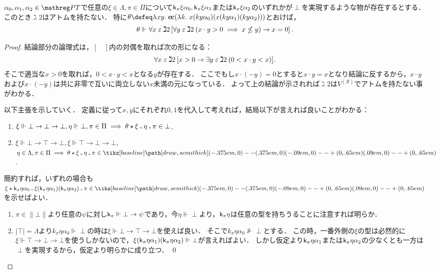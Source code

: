 \documentclass[realisability.tex]{subfiles}
\begin{document}
\begin{lemma}
 $\alpha_0, \alpha_1, \alpha_2 \in \PT$で任意の$\xi \in \Lambda, \pi \in \Pi$について$\mathsf{k}_\pi \xi \alpha_0, \mathsf{k}_\pi \xi \alpha_1$または$\mathsf{k}_\pi \xi \alpha_2$のいずれかが$\perp$を実現するような物が存在するとする．
 このとき$\gimel2$はアトムを持たない．
 特に$\theta \defeq \abs{xy}{\cc (\abs{k}{x (k y \alpha_0)(x (k y \alpha_1)(k y \alpha_2))})}$とおけば，
 \[
  \theta \Vdash \forall x \mathrel{\varepsilon} \gimel 2 \left[ \forall y \mathrel{\varepsilon} \gimel 2 \: (x \cdot y > 0 \implies x \nleq y) \to x = 0 \right].
 \]
\end{lemma}
\begin{proof}
 結論部分の論理式は，$[\quad]$内の対偶を取れば次の形になる：
 \[
  \forall x \mathrel{\varepsilon} \gimel 2 \: [ x > 0 \to \exists y \mathrel{\varepsilon} \gimel 2 \: (0 < x \cdot y < x)].
 \]
 そこで適当な$x > 0$を取れば，$0 < x \cdot y < x$となる$y$が存在する．
 ここでもし$x \cdot (- y) = 0$とすると$x \cdot y = x$となり結論に反するから，$x \cdot y$および$x \cdot (- y)$は共に非零で互いに両立しない$x$未満の元になっている．
 よって上の結論が示されれば$\gimel 2$は$V^{(\mathcal{R})}$でアトムを持たない事がわかる．

 以下主張を示していく．
 定義に従って$x, y$にそれぞれ$0, 1$を代入して考えれば，結局以下が言えれば良いことがわかる：
 \begin{enumerate}
  \item $\xi \Vdash \bot \to \bot \to \bot, \eta \Vdash \bot, \pi \in \Pi \implies \KVM{\theta \xi \eta \pi} \in \bot$,
  \item $\xi \Vdash \bot \to \top \to \bot, \xi \Vdash \top \to \bot \to \bot$, $\eta \in \Lambda, \pi \in \Pi \implies \KVM{\theta \xi \eta \pi} \in \pole$.
 \end{enumerate}
 簡約すれば，いずれの場合も$\KVM{\xi {{\conti_\pi \eta \alpha_0}}{\xi (\conti_\pi \eta \alpha_1)(\conti_\pi \eta \alpha_2)} \pi} \in \pole$を示せばよい．
 \begin{enumerate}
  \item $\pi \in \|\bot\|$より任意の$\psi$に対し$\mathsf{k}_\pi \Vdash \bot \to \psi$であり，今$\eta \Vdash \perp$より，$\mathsf{k}_\pi \eta$は任意の型を持ちうることに注意すれば明らか．
  \item $|\top| = \Lambda$より$k_\pi \eta \alpha_0 \Vdash \perp$の時は$\xi \Vdash \bot \to \top \to \bot$を使えば良い．
        そこで$k_\pi \eta \alpha_0 \nVdash \perp$とする．
        この時，一番外側の$\xi$の型は必然的に$\xi \Vdash \top \to \bot \to \bot$を使うしかないので，$\xi (\mathsf{k}_\pi \eta \alpha_1) (\mathsf{k}_\pi \eta \alpha_2) \Vdash \bot$が言えればよい．
        しかし仮定より$\mathsf{k}_\pi \eta \alpha_1$または$\mathsf{k}_\pi \eta \alpha_2$の少なくとも一方は$\perp$を実現するから，仮定より明らかに成り立つ． \qed
 \end{enumerate}
\end{proof}
\end{document}
